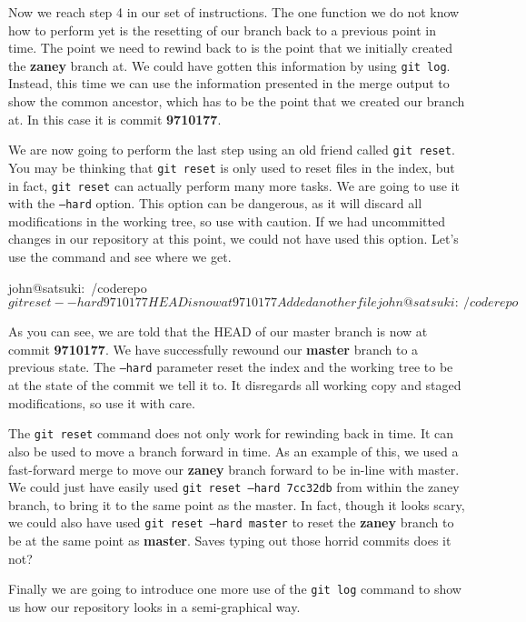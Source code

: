Now we reach step 4 in our set of instructions.
The one function we do not know how to perform yet is the resetting of our branch back to a previous point in time.
The point we need to rewind back to is the point that we initially created the \textbf{zaney} branch at.
We could have gotten this information by using \texttt{git log}.
Instead, this time we can use the information presented in the merge output to show the common ancestor, which has to be the point that we created our branch at.
In this case it is commit \textbf{9710177}.

We are now going to perform the last step using an old friend called \texttt{git reset}.
You may be thinking that \texttt{git reset} is only used to reset files in the index, but in fact, \texttt{git reset} can actually perform many more tasks.
We are going to use it with the \texttt{--hard} option.
This option can be dangerous, as it will discard all modifications in the working tree, so use with caution.
If we had uncommitted changes in our repository at this point, we could not have used this option.
Let's use the command and see where we get.

\begin{code}
john@satsuki:~/coderepo$ git reset --hard 9710177
HEAD is now at 9710177 Added another file
john@satsuki:~/coderepo$
\end{code}

As you can see, we are told that the HEAD of our master branch is now at commit \textbf{9710177}.
We have successfully rewound our \textbf{master} branch to a previous state.
The \texttt{--hard} parameter reset the index and the working tree to be at the state of the commit we tell it to.
It disregards all working copy and staged modifications, so use it with care.

The \texttt{git reset} command does not only work for rewinding back in time.
It can also be used to move a branch forward in time.
As an example of this, we used a fast-forward merge to move our \textbf{zaney} branch forward to be in-line with master.
We could just have easily used \texttt{git reset --hard 7cc32db} from within the zaney branch, to bring it to the same point as the master.
In fact, though it looks scary, we could also have used \texttt{git reset --hard master} to reset the \textbf{zaney} branch to be at the same point as \textbf{master}.
Saves typing out those horrid commits does it not?

Finally we are going to introduce one more use of the \texttt{git log} command to show us how our repository looks in a semi-graphical way.

